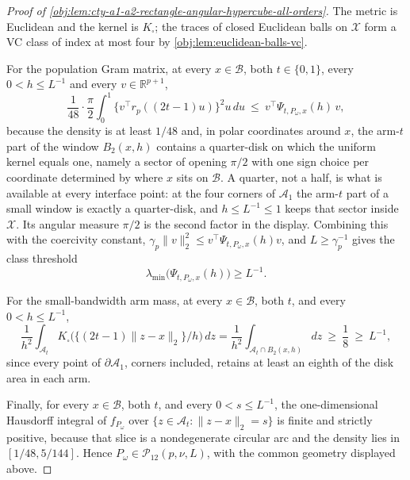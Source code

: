 \begin{proof}[Proof of \cref{obj:lem:cty-a1-a2-rectangle-angular-hypercube-all-orders}]
The metric is Euclidean and the kernel is \(K_\square\); the traces of closed Euclidean balls on \(\mathcal X\) form a VC class of index at most four by \cref{obj:lem:euclidean-balls-vc}.

For the population Gram matrix, at every \(x\in\mathcal B\), both \(t\in\{0,1\}\), every \(0<h\leq L^{-1}\) and every \(v\in\mathbb R^{p+1}\),
\[
\frac1{48}\cdot\frac\pi2
\int_0^1\bigl\{v^\top r_p((2t-1)u)\bigr\}^2u\,du
\ \leq\
v^\top\Psi_{t,P_\omega,x}(h)\,v ,
\]
because the density is at least \(1/48\) and, in polar coordinates around \(x\), the arm-\(t\) part of the window \(B_2(x,h)\) contains a quarter-disk on which the uniform kernel equals one, namely a sector of opening \(\pi/2\) with one sign choice per coordinate determined by where \(x\) sits on \(\mathcal B\).  A quarter, not a half, is what is available at every interface point: at the four corners of \(\mathcal A_1\) the arm-\(t\) part of a small window is exactly a quarter-disk, and \(h\leq L^{-1}\leq1\) keeps that sector inside \(\mathcal X\).  Its angular measure \(\pi/2\) is the second factor in the display.  Combining this with the coercivity constant, \(\gamma_p\lVert v\rVert_2^2\leq v^\top\Psi_{t,P_\omega,x}(h)v\), and \(L\geq\gamma_p^{-1}\) gives the class threshold
\[
\lambda_{\min}\bigl(\Psi_{t,P_\omega,x}(h)\bigr)\geq L^{-1}.
\]

For the small-bandwidth arm mass, at every \(x\in\mathcal B\), both \(t\), and every \(0<h\leq L^{-1}\),
\[
\frac1{h^2}\int_{\mathcal A_t}
K_\square\bigl(\{(2t-1)\lVert z-x\rVert_2\}/h\bigr)\,dz
=
\frac1{h^2}\int_{\mathcal A_t\cap B_2(x,h)}dz
\ \geq\
\frac18
\ \geq\
L^{-1},
\]
since every point of \(\partial\mathcal A_1\), corners included, retains at least an eighth of the disk area in each arm.

Finally, for every \(x\in\mathcal B\), both \(t\), and every \(0<s\leq L^{-1}\), the one-dimensional Hausdorff integral of \(f_{P_\omega}\) over \(\{z\in\mathcal A_t:\lVert z-x\rVert_2=s\}\) is finite and strictly positive, because that slice is a nondegenerate circular arc and the density lies in \([1/48,5/144]\).
Hence \(P_\omega\in\mathcal P_{12}(p,\nu,L)\), with the common geometry displayed above.


\end{proof}
